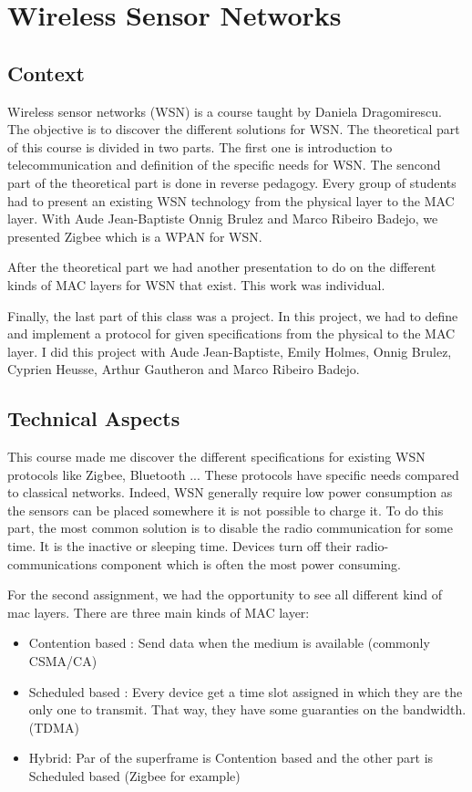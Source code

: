 \section{Wireless Sensor Networks}

\subsection{Context}

Wireless sensor networks (WSN) is a course taught by Daniela Dragomirescu. The objective is to discover the different solutions for WSN. The theoretical part of this course is divided in two parts. The first one is introduction to telecommunication and definition of the specific needs for WSN. The sencond part of the theoretical part is done in reverse pedagogy. Every group of students had to present an existing WSN technology from the physical layer to the MAC layer. With Aude Jean-Baptiste Onnig Brulez and Marco Ribeiro Badejo, we presented Zigbee which is a WPAN for WSN.
\smallskip

After the theoretical part we had another presentation to do on the different kinds of MAC layers for WSN that exist. This work was individual.
\smallskip

Finally, the last part of this class was a project. In this project, we had to define and implement a protocol for given specifications from the physical to the MAC layer. I did this project with Aude Jean-Baptiste, Emily Holmes, Onnig Brulez, Cyprien Heusse, Arthur Gautheron and Marco Ribeiro Badejo.

\subsection{Technical Aspects}

This course made me discover the different specifications for existing WSN protocols like Zigbee, Bluetooth ... These protocols have specific needs compared to classical networks. Indeed, WSN generally require low power consumption as the sensors can be placed somewhere it is not possible to charge it. To do this part, the most common solution is to disable the radio communication for some time. It is the inactive or sleeping time. Devices turn off their radio-communications component which is often the most power consuming.
\smallskip

For the second assignment, we had the opportunity to see all different kind of mac layers. There are three main kinds of MAC layer:
\begin{itemize}
    \item Contention based : Send data when the medium is available (commonly CSMA/CA)
    \item Scheduled based : Every device get a time slot assigned in which they are the only one to transmit. That way, they have some guaranties on the bandwidth. (TDMA)
    \item Hybrid: Par of the superframe is Contention based and the other part is Scheduled based (Zigbee for example)
\end{itemize}

